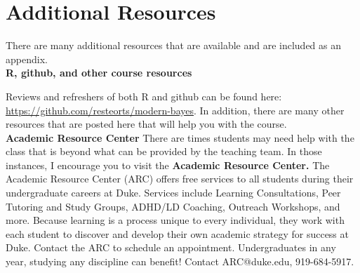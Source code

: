 \documentclass[11pt]{article}
\begin{document}



\clearpage
\newpage
\appendix

\section{Additional Resources}
There are many additional resources that are available and are included as an appendix. \\

\textbf{R, github, and other course resources}

Reviews and refreshers of both R and github can be found here: \url{https://github.com/resteorts/modern-bayes}. In addition, there are many other resources that are posted here that will help you with the course. \\


\textbf{Academic Resource Center} There are times students may need help with the class that is beyond what can be provided by the teaching team. In those instances, I encourage you to visit the \textbf{Academic Resource Center.} The Academic Resource Center (ARC) offers free services to all students during their undergraduate careers at Duke. Services include Learning Consultations, Peer Tutoring and Study Groups, ADHD/LD Coaching, Outreach Workshops, and more. Because learning is a process unique to every individual, they work with each student to discover and develop their own academic strategy for success at Duke. Contact the ARC to schedule an appointment. Undergraduates in any year, studying any discipline can benefit! Contact ARC@duke.edu, 919-684-5917.\\
\end{document}
